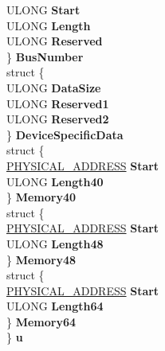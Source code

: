\begin{DoxyCompactItemize}
\begin{tabbing}
\>\>ULONG {\bfseries Start}\\
\>\>ULONG {\bfseries Length}\\
\>\>ULONG {\bfseries Reserved}\\
\>\} {\bfseries BusNumber}\\
\>struct \{\\
\>\>ULONG {\bfseries DataSize}\\
\>\>ULONG {\bfseries Reserved1}\\
\>\>ULONG {\bfseries Reserved2}\\
\>\} {\bfseries DeviceSpecificData}\\
\>struct \{\\
\>\>\hyperlink{union___l_a_r_g_e___i_n_t_e_g_e_r}{PHYSICAL\_ADDRESS} {\bfseries Start}\\
\>\>ULONG {\bfseries Length40}\\
\>\} {\bfseries Memory40}\\
\>struct \{\\
\>\>\hyperlink{union___l_a_r_g_e___i_n_t_e_g_e_r}{PHYSICAL\_ADDRESS} {\bfseries Start}\\
\>\>ULONG {\bfseries Length48}\\
\>\} {\bfseries Memory48}\\
\>struct \{\\
\>\>\hyperlink{union___l_a_r_g_e___i_n_t_e_g_e_r}{PHYSICAL\_ADDRESS} {\bfseries Start}\\
\>\>ULONG {\bfseries Length64}\\
\>\} {\bfseries Memory64}\\
\} {\bfseries u}\\


\end{tabbing}
\end{DoxyCompactItemize}
